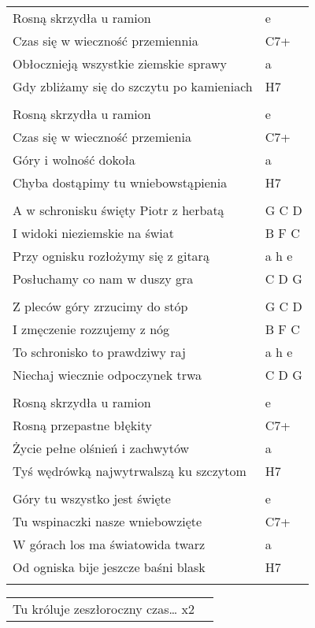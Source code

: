\documentclass[a5paper]{article}
\begin{document}
\noindent
\begin{tabular}{@{}p{9cm}p{3cm}@{}}
Rosną skrzydła u ramion & e \\
Czas się w wieczność przemiennia & C7+ \\
Obłocznieją wszystkie ziemskie sprawy & a \\
Gdy zbliżamy się do szczytu po kamieniach & H7 \\ \\

Rosną skrzydła u ramion & e \\
Czas się w wieczność przemienia & C7+ \\
Góry i wolność dokoła & a \\
Chyba dostąpimy tu wniebowstąpienia & H7 \\ \\

A w schronisku święty Piotr z herbatą & G C D \\
I widoki nieziemskie na świat & B F C \\
Przy ognisku rozłożymy się z gitarą & a h e \\
Posłuchamy co nam w duszy gra & C D G \\ \\

Z pleców góry zrzucimy do stóp & G C D \\
I zmęczenie rozzujemy z nóg & B F C \\
To schronisko to prawdziwy raj & a h e \\
Niechaj wiecznie odpoczynek trwa & C D G \\ \\

Rosną skrzydła u ramion & e \\
Rosną przepastne błękity & C7+ \\
Życie pełne olśnień i zachwytów & a \\
Tyś wędrówką najwytrwalszą ku szczytom & H7 \\ \\

Góry tu wszystko jest święte & e \\
Tu wspinaczki nasze wniebowzięte & C7+ \\
W górach los ma światowida twarz & a \\
Od ogniska bije jeszcze baśni blask & H7 \\ \\
\end{tabular}

\noindent
\begin{tabular}{@{}p{8.5cm}p{3cm}@{}}
Tu króluje zeszłoroczny czas… x2
\end{tabular}
\end{document}
